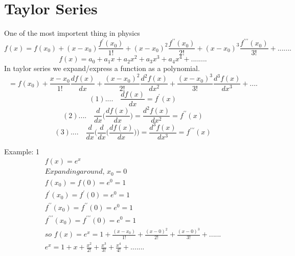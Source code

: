 \section{Taylor Series}

One of the most importent thing in physics
\begin{equation}
	f(x) = f(x_0)+(x-x_0)\frac{f^\prime(x_0)}{1!}+(x-x_0)^2\frac{f^{\prime\prime}(x_0)}{2!}+(x-x_0)^3\frac{f^{\prime\prime\prime}(x_0)}{3!}+.......
\end{equation}
\begin{equation}
	f(x) = a_0+a_1x+a_2x^2+a_3x^3+a_4x^4+........
\end{equation}
In taylor series we expand/express a function as a polynomial.
\newline
\begin{equation}
	=f(x_0)+\frac{x-x_0}{1!}\frac{df(x)}{dx}+\frac{(x-x_0)^2}{2!}\frac{d^2f(x)}{dx^2}+\frac{(x-x_0)^3}{3!}\frac{d^3f(x)}{dx^3}+....
\end{equation}
\begin{equation}
	(1).... \quad \frac{df(x)}{dx} = f^\prime(x)
\end{equation}
\begin{equation}
	(2).... \quad \frac{d}{dx}\bigg(\frac{df(x)}{dx}\bigg) = \frac{d^2f(x)}{dx^2} = f^{\prime\prime}(x)
\end{equation}
\begin{equation}
	(3).... \quad \frac{d}{dx}\bigg(\frac{d}{dx}\bigg(\frac{df(x)}{dx}\bigg)\bigg) = \frac{d^3f(x)}{dx^3} = f^{\prime\prime\prime}(x)
\end{equation}

Example: 1
\begin{align}
	f(x) = e^x \\
	Expanding around,\,  x_0 = 0  \\
	f(x_0) = f(0) = e^0=1 \\
	f^\prime(x_0)=f^\prime(0)=e^0=1 \\
	f^{\prime\prime}(x_0)=f^{\prime\prime}(0)=e^0=1 \\
	f^{\prime\prime\prime}(x_0)=f^{\prime\prime\prime}(0)=e^0=1 \\
	so \,\, f(x) = e^x=1+\frac{(x-x_0)}{1!}+\frac{(x-0)^2}{2!}+\frac{(x-0)^3}{3!}+...... \\
	e^x = 1 + x+\frac{x^2}{2!}+\frac{x^3}{3!}+\frac{x^4}{4!}+....... \\	
\end{align}
	
